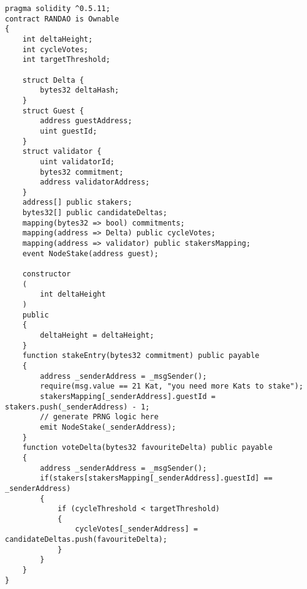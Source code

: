 \begin{verbatim}
pragma solidity ^0.5.11;
contract RANDAO is Ownable
{
    int deltaHeight;
    int cycleVotes;
    int targetThreshold;
    
    struct Delta {
        bytes32 deltaHash;
    }
    struct Guest {
        address guestAddress;
        uint guestId;
    }
    struct validator {
        uint validatorId;
        bytes32 commitment;
        address validatorAddress;
    }
    address[] public stakers;
    bytes32[] public candidateDeltas;
    mapping(bytes32 => bool) commitments;
    mapping(address => Delta) public cycleVotes;    
    mapping(address => validator) public stakersMapping;
    event NodeStake(address guest);
    
    constructor
    (
        int deltaHeight
    )
    public
    {
        deltaHeight = deltaHeight;
    }
    function stakeEntry(bytes32 commitment) public payable
    {
        address _senderAddress = _msgSender();
        require(msg.value == 21 Kat, "you need more Kats to stake");
        stakersMapping[_senderAddress].guestId = stakers.push(_senderAddress) - 1;
        // generate PRNG logic here
        emit NodeStake(_senderAddress);
    }
    function voteDelta(bytes32 favouriteDelta) public payable
    {
        address _senderAddress = _msgSender();
        if(stakers[stakersMapping[_senderAddress].guestId] == _senderAddress)
        {
            if (cycleThreshold < targetThreshold)
            {
                cycleVotes[_senderAddress] = candidateDeltas.push(favouriteDelta);
            }
        }
    }
}
\end{verbatim}


